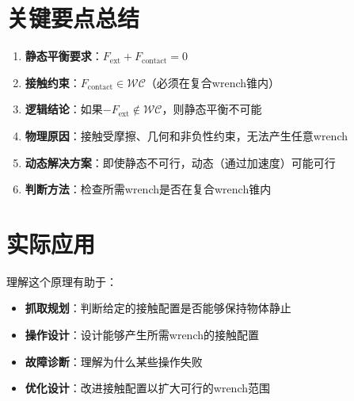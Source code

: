 \documentclass[12pt,a4paper]{article}
\begin{document}
\section{关键要点总结}

\begin{enumerate}
    \item \textbf{静态平衡要求}：$F_{\text{ext}} + F_{\text{contact}} = 0$
    
    \item \textbf{接触约束}：$F_{\text{contact}} \in \mathcal{WC}$（必须在复合wrench锥内）
    
    \item \textbf{逻辑结论}：如果$-F_{\text{ext}} \notin \mathcal{WC}$，则静态平衡不可能
    
    \item \textbf{物理原因}：接触受摩擦、几何和非负性约束，无法产生任意wrench
    
    \item \textbf{动态解决方案}：即使静态不可行，动态（通过加速度）可能可行
    
    \item \textbf{判断方法}：检查所需wrench是否在复合wrench锥内
\end{enumerate}

\section{实际应用}

理解这个原理有助于：

\begin{itemize}
    \item \textbf{抓取规划}：判断给定的接触配置是否能够保持物体静止
    \item \textbf{操作设计}：设计能够产生所需wrench的接触配置
    \item \textbf{故障诊断}：理解为什么某些操作失败
    \item \textbf{优化设计}：改进接触配置以扩大可行的wrench范围
\end{itemize}
\end{document}
